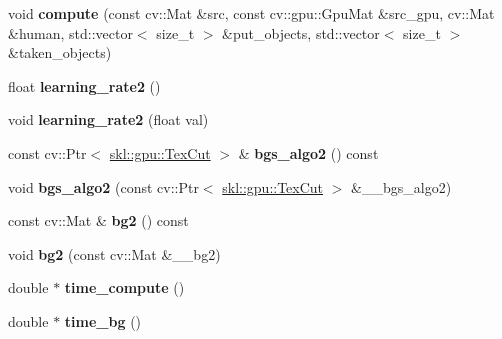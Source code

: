 \begin{DoxyCompactItemize}
\hypertarget{classskl_1_1gpu_1_1_table_object_manager_bi_background_af875fcfdae8a5dca77ca964311b48f51}{}\label{classskl_1_1gpu_1_1_table_object_manager_bi_background_af875fcfdae8a5dca77ca964311b48f51} 
void {\bfseries compute} (const cv\+::\+Mat \&src, const cv\+::gpu\+::\+Gpu\+Mat \&src\+\_\+gpu, cv\+::\+Mat \&human, std\+::vector$<$ size\+\_\+t $>$ \&put\+\_\+objects, std\+::vector$<$ size\+\_\+t $>$ \&taken\+\_\+objects)
\item 
\hypertarget{classskl_1_1gpu_1_1_table_object_manager_bi_background_aed8aee1288baea588f768638a63bcc78}{}\label{classskl_1_1gpu_1_1_table_object_manager_bi_background_aed8aee1288baea588f768638a63bcc78} 
float {\bfseries learning\+\_\+rate2} ()
\item 
\hypertarget{classskl_1_1gpu_1_1_table_object_manager_bi_background_a28a17c7fa031753bf2e822732cf0a342}{}\label{classskl_1_1gpu_1_1_table_object_manager_bi_background_a28a17c7fa031753bf2e822732cf0a342} 
void {\bfseries learning\+\_\+rate2} (float val)
\item 
\hypertarget{classskl_1_1gpu_1_1_table_object_manager_bi_background_a4e9f3260c15904870a4c10f92d3fcdc2}{}\label{classskl_1_1gpu_1_1_table_object_manager_bi_background_a4e9f3260c15904870a4c10f92d3fcdc2} 
const cv\+::\+Ptr$<$ \hyperlink{classskl_1_1gpu_1_1_tex_cut}{skl\+::gpu\+::\+Tex\+Cut} $>$ \& {\bfseries bgs\+\_\+algo2} () const
\item 
\hypertarget{classskl_1_1gpu_1_1_table_object_manager_bi_background_aade4b07c073b566b7ef79078cc73fb90}{}\label{classskl_1_1gpu_1_1_table_object_manager_bi_background_aade4b07c073b566b7ef79078cc73fb90} 
void {\bfseries bgs\+\_\+algo2} (const cv\+::\+Ptr$<$ \hyperlink{classskl_1_1gpu_1_1_tex_cut}{skl\+::gpu\+::\+Tex\+Cut} $>$ \&\+\_\+\+\_\+bgs\+\_\+algo2)
\item 
\hypertarget{classskl_1_1gpu_1_1_table_object_manager_bi_background_a56b0da50686913af3c87e9439275f623}{}\label{classskl_1_1gpu_1_1_table_object_manager_bi_background_a56b0da50686913af3c87e9439275f623} 
const cv\+::\+Mat \& {\bfseries bg2} () const
\item 
\hypertarget{classskl_1_1gpu_1_1_table_object_manager_bi_background_aba49b65c3192a0a587d584d00c635424}{}\label{classskl_1_1gpu_1_1_table_object_manager_bi_background_aba49b65c3192a0a587d584d00c635424} 
void {\bfseries bg2} (const cv\+::\+Mat \&\+\_\+\+\_\+bg2)
\item 
\hypertarget{classskl_1_1gpu_1_1_table_object_manager_bi_background_a5f0954a0268c4ab3822d22512684ecdc}{}\label{classskl_1_1gpu_1_1_table_object_manager_bi_background_a5f0954a0268c4ab3822d22512684ecdc} 
double $\ast$ {\bfseries time\+\_\+compute} ()
\item 
\hypertarget{classskl_1_1gpu_1_1_table_object_manager_bi_background_acc610e7b507cf93d136b39eeaeaec44a}{}\label{classskl_1_1gpu_1_1_table_object_manager_bi_background_acc610e7b507cf93d136b39eeaeaec44a} 
double $\ast$ {\bfseries time\+\_\+bg} ()
\end{DoxyCompactItemize}
